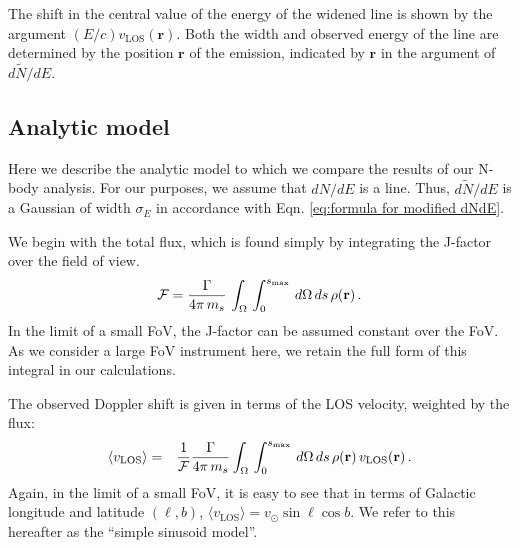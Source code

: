 \documentclass[aps,prd,10pt,twocolumn,superscriptaddress,showpacs,footinbib]{revtex4-1}
\newcommand{\br}[0]{\mathbf{r}}
\newcommand{\los}[0]{\mathrm{LOS}}
\begin{document}
The shift in the central value of the energy of the widened line is shown by the argument $(E/c)
v_\los(\br) $.  Both the width and observed energy of the line are determined by the position
$\br$ of the emission, indicated by $\br$ in the argument of $d\tilde{N}/dE$.

\subsection{Analytic model}
\label{sec:simulations}



Here we describe the analytic model to which we compare the results of our N-body analysis.
For our purposes, we assume that $dN/dE$ is a line. Thus, $d\tilde{N}/dE$ is a Gaussian of width $\sigma_E$
in accordance with Eqn. \eqref{eq:formula for modified dNdE}.

We begin with the total flux, which is found simply by integrating the J-factor over the field of
view. 
\begin{eqnarray}
\mathcal{F} =  \frac{\Gamma}{4\pi \, m_s} \, \int _\Omega \, \int _0 ^{s_{\rm max}}  \,  d\Omega\,ds
\, \rho(\br) \, .
\label{eq:lineflux}
\end{eqnarray}
In the limit of a small FoV, the J-factor can be assumed constant over the FoV. As we
consider a large FoV instrument here, we retain the full form of this integral in our calculations.

The observed Doppler shift is given in terms of the LOS velocity, weighted by the flux:
\begin{eqnarray}
	\langle v_\los\rangle &=& \frac{1}{\mathcal{F}}\frac{\Gamma}{4\pi \, m_s} 
	\int _\Omega \, \int _0 ^{s_{\rm max}}  \, d\Omega\,ds \, \rho(\br) \, v_\los(\br) \, .
\label{eq:lineshift}
\end{eqnarray}
Again, in the limit of a small FoV, it is easy to see that in terms of Galactic longitude and
latitude $(\ell, b)$, $\langle v_\los\rangle = v_\odot \sin \ell\cos b$. We refer to this hereafter
as the ``simple sinusoid model''. 
\end{document}

